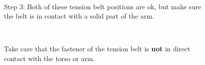 \begin{figure}[h!]
\centering
\mbox{\quad
{}}
\caption{Step 3: Both of these tension belt positions are ok, but make sure the belt is in contact with a solid part of the arm.} %
\end{figure}

\begin{figure}[h!]
\centering
\mbox{\quad
{}}
\caption{Take care that the fastener of the tension belt is {\bf not} in direct contact with the torso or arm.} %
\end{figure}

